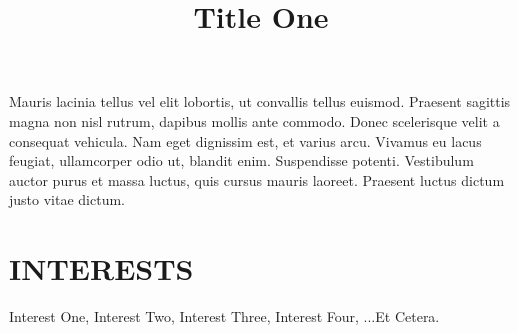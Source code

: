 \documentclass[margin]{res}
\begin{document}
\begin{resume}
\title{\textbf{Title One}}
\begin{position}
Mauris lacinia tellus vel elit lobortis, ut convallis tellus euismod. Praesent 
sagittis magna non nisl rutrum, dapibus mollis ante commodo. Donec scelerisque 
velit a consequat vehicula. Nam eget dignissim est, et varius arcu. Vivamus eu 
lacus feugiat, ullamcorper odio ut, blandit enim. Suspendisse potenti. 
Vestibulum auctor purus et massa luctus, quis cursus mauris laoreet. Praesent 
luctus dictum justo vitae dictum.
\end{position}
\section{INTERESTS}
Interest One, Interest Two, Interest Three, Interest Four, ...Et Cetera.
\end{resume}
\end{document}
